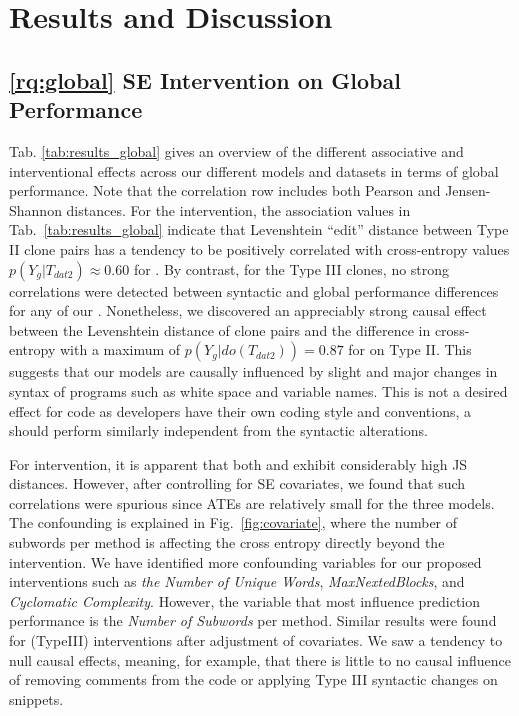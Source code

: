 \section{Results and Discussion}
\label{sec:results-conditioned}

\subsection{\ref{rq:global} SE Intervention on Global Performance}



Tab. \ref{tab:results_global} gives an overview of the different associative and interventional effects across our different models and datasets in terms of global performance. Note that the correlation row includes both Pearson and Jensen-Shannon distances. For the \datainterII intervention, the association values in Tab.~\ref{tab:results_global} indicate that Levenshtein ``edit'' distance between Type II clone pairs has a tendency to be positively correlated with cross-entropy values $p(Y_g|T_{dat2})\approx0.60$ for \gru. By contrast, for the Type III clones, no strong correlations were detected between syntactic and global performance differences for any of our \nlms. Nonetheless, we discovered an appreciably strong causal effect between the Levenshtein distance of clone pairs and the difference in cross-entropy with a maximum of $p(Y_g|do(T_{dat2}))=0.87$ for \gru on Type II. This suggests that our models are causally influenced by slight and major changes in syntax of programs such as white space and variable names. This is not a desired effect for code \nlms as developers have their own coding style and conventions, a \nlm should perform similarly independent from the syntactic alterations. 

For \datainterI intervention, it is apparent that both \rnn and \tf exhibit considerably high JS distances. However, after controlling for SE covariates, we found that such correlations were spurious since ATEs are relatively small for the three models. The confounding is explained in Fig.~\ref{fig:covariate}, where the number of subwords per method is affecting the cross entropy directly beyond the \datainterI intervention. We have identified more confounding variables for our proposed interventions such as \textit{the Number of Unique Words}, \textit{MaxNextedBlocks}, and \textit{Cyclomatic Complexity}. However, the variable that most influence prediction performance is the \textit{Number of Subwords} per method. Similar results were found for \datainterIII (TypeIII) interventions after adjustment of covariates. We saw a tendency to null causal effects, meaning, for example, that there is little to no causal influence of removing comments from the code or applying Type III syntactic changes on snippets.

